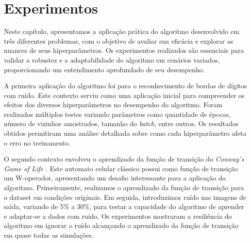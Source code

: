 

\newcommand{\sla}{\textbackslash}

\newcommand{\cmd}[1]{\textsf{#1}}

\newcommand{\pkg}[1]{\textsf{#1}}

\newcommand{\ltxcmd}[1]{\cmd{\sla{}#1}}

\chapter{Experimentos}
\label{chap:experimentos}

Neste capítulo, apresentamos a aplicação prática do algoritmo desenvolvido em três diferentes problemas, com o objetivo de avaliar sua eficácia e explorar as nuances de seus hiperparâmetros. Os experimentos realizados são essenciais para validar a robustez e a adaptabilidade do algoritmo em cenários variados, proporcionando um entendimento aprofundado de seu desempenho.

A primeira aplicação do algoritmo foi para o reconhecimento de bordas de dígitos com ruído. Este contexto serviu como uma aplicação inicial para compreender os efeitos dos diversos hiperparâmetros no desempenho do algoritmo. Foram realizados múltiplos testes variando parâmetros como quantidade de épocas, número de vizinhos amostrados, tamanho do \textit{batch}, entre outros. Os resultados obtidos permitiram uma análise detalhada sobre como cada hiperparâmetro afeta o erro no treinamento.

O segundo contexto envolveu o aprendizado da função de transição do \textit{Conway's Game of Life} \cite{GOL}. Este automato celular clássico possui como função de transição um W-operador, apresentando um desafio interessante para a aplicação do algoritmo. Primeiramente, realizamos o aprendizado da função de transição para o dataset em condições originais. Em seguida, introduzimos ruído nas imagens de saída, variando de 5\% a 30\%, para testar a capacidade do algoritmo de aprender e adaptar-se a dados com ruído. Os experimentos mostraram a resiliência do algoritmo em ignorar o ruído alcançando o aprendizado da função de transição em quase todas as simulações.


